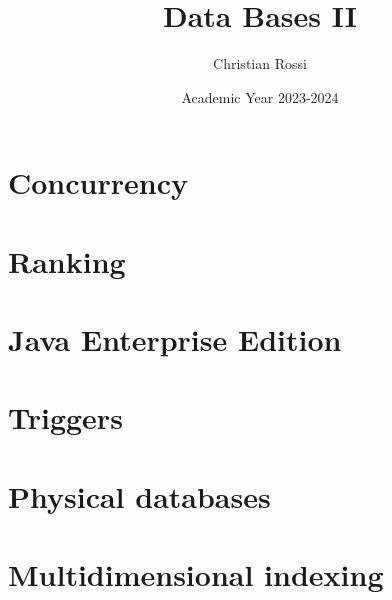 \documentclass[12pt, a4paper]{report}
\title{\textbf{Data Bases II}}
\author{Christian Rossi}
\date{Academic Year 2023-2024}
\begin{document}
    \maketitle

    

    \cleardoublepage

    \tableofcontents

    \cleardoublepage

    \chapter{Concurrency}
    
    
    
    
    
    
    
    
    

    \chapter{Ranking}
    
    
    
    
    
    

    \chapter{Java Enterprise Edition}
    
    
    
    
    
    
    

    \chapter{Triggers}
    
    
    
    

    \chapter{Physical databases}
        
      
      
    
    \chapter{Multidimensional indexing}
    
    
    
\end{document}
